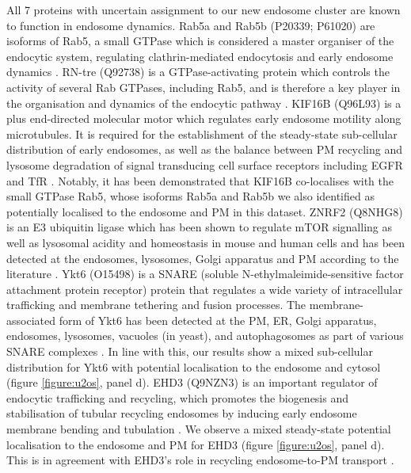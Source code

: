 \documentclass[12pt,english]{article}
\begin{document}
All 7 proteins with uncertain assignment to our new endosome cluster are known to function in endosome dynamics. Rab5a and Rab5b (P20339; P61020) are isoforms of Rab5, a small GTPase which is considered a master organiser of the endocytic system, regulating clathrin-mediated endocytosis and early endosome dynamics \citep{Simonsen::1998,Woodman::2000, Zerial::2001, Rink::2005, Mendoza::2013, Chen::2014, Gautreau::2014, Law::2017}. RN-tre (Q92738) is a GTPase-activating protein which controls the activity of several Rab GTPases, including Rab5, and is therefore a key player in the organisation and dynamics of the endocytic pathway \citep{Lanzetti::2000, Gautreau::2014}. KIF16B (Q96L93) is a plus end-directed molecular motor which regulates early endosome motility along microtubules. It is required for the establishment of the steady-state sub-cellular distribution of early endosomes, as well as the balance between PM recycling and lysosome degradation of signal transducing cell surface receptors including EGFR and TfR \citep{Hoepfner:2005, Carlucci::2010}. Notably, it has been demonstrated that KIF16B co-localises with the small GTPase Rab5, whose isoforms Rab5a and Rab5b we also identified as potentially localised to the endosome and PM in this dataset. ZNRF2 (Q8NHG8) is an E3 ubiquitin ligase which has been shown to regulate mTOR signalling as well as lysosomal acidity and homeostasis in mouse and human cells and has been detected at the endosomes, lysosomes, Golgi apparatus and PM according to the literature \citep{Araki:2003, Hoxhaj:2016}. Ykt6 (O15498) is a SNARE (soluble N-ethylmaleimide-sensitive factor attachment protein receptor) protein that regulates a wide variety of intracellular trafficking and membrane tethering and fusion processes. The membrane-associated form of Ykt6 has been detected at the PM, ER, Golgi apparatus, endosomes, lysosomes, vacuoles (in yeast), and autophagosomes as part of various SNARE complexes \citep{Dilcher::2001, Tai:2004,Fukasawa::2004,Meiringer::2008, Takats::2018, Matsui::2018, Linnemannstons::2018, Yong::2019}. In line with this, our results show a mixed sub-cellular distribution for Ykt6 with potential localisation to the endosome and cytosol (figure \ref{figure:u2os}, panel d). EHD3 (Q9NZN3) is an important regulator of endocytic trafficking and recycling, which promotes the biogenesis and stabilisation of tubular recycling endosomes by inducing early endosome membrane bending and tubulation \citep{Bahl::2016,Henmi::2016}. We observe a mixed steady-state potential localisation to the endosome and PM for EHD3 (figure \ref{figure:u2os}, panel d). This is in agreement with EHD3's role in recycling endosome-to-PM transport \citep{Naslavsky::2006,Naslavsky::2009,George::2007,Cabasso::2015, Henmi::2016}.
\end{document}
